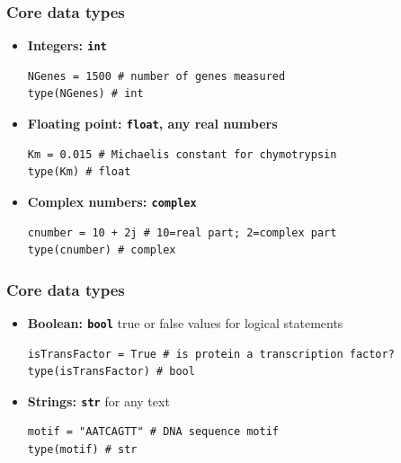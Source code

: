 \documentclass[xcolor=table]{beamer}
\begin{document}
\begin{frame}[fragile]
\frametitle{Core data types}

\begin{itemize}\addtolength{\itemsep}{0.5\baselineskip}

\item<1-> \textbf{Integers: \texttt{int}}\\
\begin{lstlisting}[style=python]
NGenes = 1500 # number of genes measured
type(NGenes) # int
\end{lstlisting}
	
\item<2-> \textbf{Floating point: \texttt{float}, any real numbers}
\begin{lstlisting}[style=python]
Km = 0.015 # Michaelis constant for chymotrypsin
type(Km) # float
\end{lstlisting}
	
\item<3-> \textbf{Complex numbers: \texttt{complex}}
\begin{lstlisting}[style=python]
cnumber = 10 + 2j # 10=real part; 2=complex part
type(cnumber) # complex
\end{lstlisting}

\end{itemize}

\end{frame}

\begin{frame}[fragile]
\frametitle{Core data types}

\begin{itemize}\addtolength{\itemsep}{0.5\baselineskip}

\item<1-> \textbf{Boolean: \texttt{bool} } true or false values for logical statements
\begin{lstlisting}[style=python]
isTransFactor = True # is protein a transcription factor?
type(isTransFactor) # bool
\end{lstlisting}

\item<2-> \textbf{Strings: \texttt{str}} for any text
\begin{lstlisting}[style=python]
motif = "AATCAGTT" # DNA sequence motif
type(motif) # str
\end{lstlisting}

\end{itemize}

\end{frame}
\end{document}
